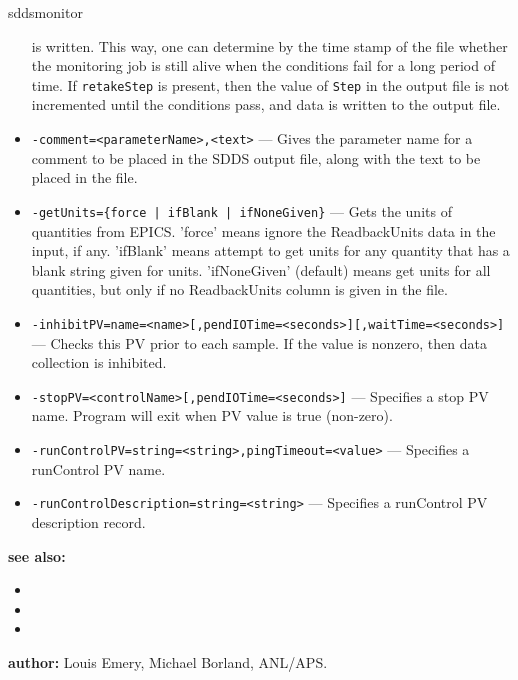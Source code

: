 \begin{sddsprog}{sddsmonitor}
\begin{itemize}
                is written. This way, one can determine by the time stamp of the file
                whether the monitoring job is still alive
                when the conditions fail for a long period of time. If \verb+retakeStep+ is
                present, then the value of \verb+Step+ in the output file is not
                incremented until the conditions pass, and data is written to the output file.
  \item {\verb+-comment=<parameterName>,<text>+} ---
                Gives the parameter name for a comment to be placed in the SDDS output file,
                along with the text to be placed in the file.
  \item {\verb+-getUnits={force | ifBlank | ifNoneGiven}+} ---
                Gets the units of quantities from EPICS. 'force' means ignore the ReadbackUnits
                data in the input, if any. 'ifBlank' means attempt to get units for any quantity
                that has a blank string given for units. 'ifNoneGiven' (default) means get units
                for all quantities, but only if no ReadbackUnits column is given in the file.
  \item {\tt -inhibitPV=name=<name>[,pendIOTime=<seconds>][,waitTime=<seconds>]} ---
                Checks this PV prior to each sample. If the value is nonzero, then data
                collection is inhibited.
  \item {\tt -stopPV=<controlName>[,pendIOTime=<seconds>]} --- Specifies a stop PV name.
                Program will exit when PV value is true (non-zero).
  \item {\tt -runControlPV=string=<string>,pingTimeout=<value>} --- Specifies a runControl PV name.
  \item {\tt -runControlDescription=string=<string>} --- Specifies a runControl PV description record.
\end{itemize}

\item \textbf{see also:}
\begin{itemize}
  \item {}
  \item {}
  \item {}
\end{itemize}
\item \textbf{author:} Louis Emery, Michael Borland, ANL/APS.
\end{sddsprog}

